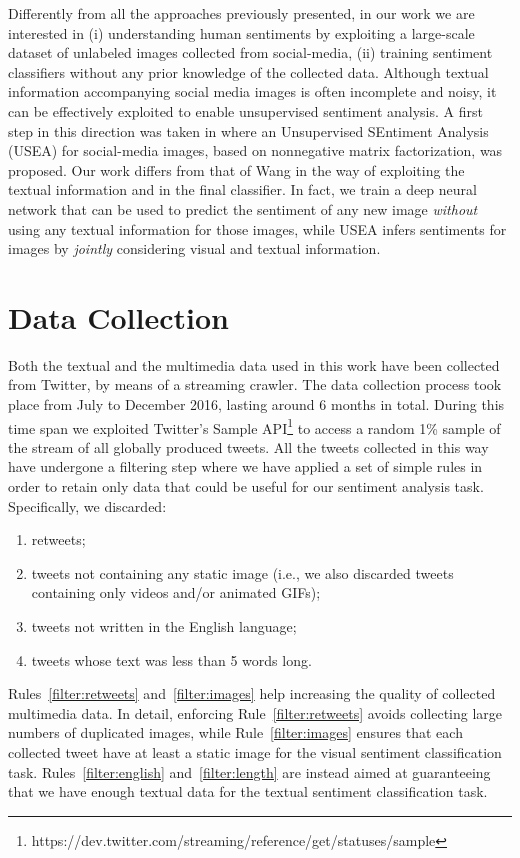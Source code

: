 Differently from all the approaches previously presented, in our work we are interested in (i) understanding human sentiments by exploiting a large-scale dataset of unlabeled images collected from social-media, (ii) training sentiment classifiers without any prior knowledge of the collected data.
Although textual information accompanying social media images is often incomplete and noisy, it can be effectively exploited to enable unsupervised sentiment analysis. A first step in this direction was taken in \cite{Wang2015:Unsupervised} where an Unsupervised SEntiment Analysis (USEA) for social-media images,  based on nonnegative matrix factorization, was proposed. Our work differs from that of Wang \etal \cite{Wang2015:Unsupervised} in the way of exploiting the textual information and in the final classifier. In fact, we train a deep neural network that can be used to predict the sentiment of any {new} image \textit{without} using any textual information for those images, while USEA infers sentiments for images by \textit{jointly} considering visual and textual information. %

\section{Data Collection}
\label{sec:vsa:dataset}
Both the textual and the multimedia data used in this work have been collected from Twitter, by means of a streaming crawler. The data collection process took place from July to December 2016, lasting around 6 months in total. During this time span we exploited Twitter's Sample API\footnote{https://dev.twitter.com/streaming/reference/get/statuses/sample} to access a random 1\% sample of the stream of all globally produced tweets. All the tweets collected in this way have undergone a filtering step where we have applied a set of simple rules in order to retain only data that could be useful for our sentiment analysis task. Specifically, we discarded:
\begin{enumerate}
\item\label{filter:retweets} retweets;
\item\label{filter:images} tweets not containing any static image (i.e., we also discarded tweets containing only videos and/or animated GIFs);
\item\label{filter:english} tweets not written in the English language;
\item\label{filter:length} tweets whose text was less than 5 words long.
\end{enumerate}
Rules~\ref{filter:retweets} and~\ref{filter:images} help increasing the quality of collected multimedia data.
In detail, enforcing Rule~\ref{filter:retweets} avoids collecting large numbers of duplicated images, while Rule~\ref{filter:images} ensures that each collected tweet have at least a static image for the visual sentiment classification task. Rules~\ref{filter:english} and~\ref{filter:length} are instead aimed at guaranteeing that we have enough textual data for the textual sentiment classification task.

